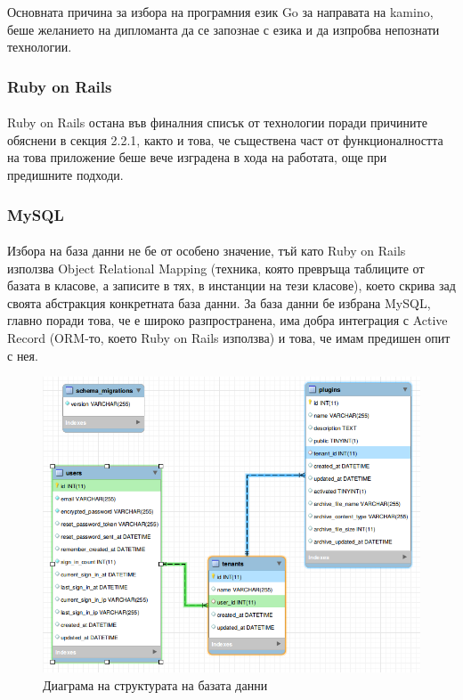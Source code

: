 \documentclass[pdftex,14pt,a4paper]{extreport}
\begin{document}
Основната причина за избора на програмния език Go за направата на kamino, беше желанието на дипломанта да се запознае с езика и да изпробва непознати технологии.
\subsubsection {Ruby on Rails}
\paragraph {}
Ruby on Rails остана във финалния списък от технологии поради причините обяснени в секция 2.2.1, както и това, че съществена част от функционалността на това приложение беше вече изградена в хода на работата, още при предишните подходи.
\subsubsection {MySQL}
\paragraph {}
Избора на база данни не бе от особено значение, тъй като Ruby on Rails използва Object Relational Mapping (техника, която превръща таблиците от базата в класове, а записите в тях, в инстанции на тези класове), което скрива зад своята абстракция конкретната база данни. За база данни бе избрана MySQL, главно поради това, че е широко разпространена, има добра интеграция с Active Record (ORM-то, което Ruby on Rails използва) и това, че имам предишен опит с нея.
\begin{figure}[h]
  \includegraphics [scale=0.57]{./diagram-db}
  \caption {Диаграма на структурата на базата данни}
\end{figure}
\end{document}

